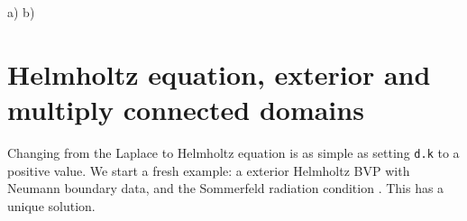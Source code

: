\bfi %
a)
b)
\efi

\section{Helmholtz equation, exterior and multiply connected domains}

Changing from the Laplace to Helmholtz equation is as simple
as setting {\tt d.k} to a positive value.
We start a fresh example: a exterior Helmholtz BVP
with Neumann boundary data, and the Sommerfeld radiation
condition \cite{coltonkress}. This has a unique solution.

